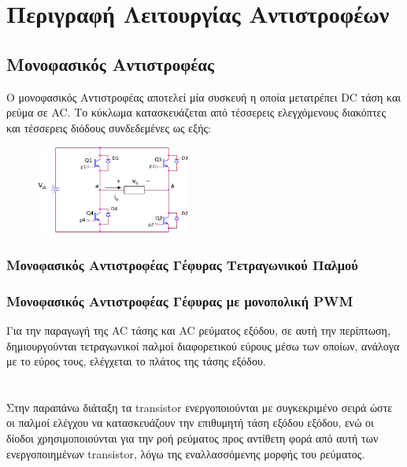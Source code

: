 \section{Περιγραφή Λειτουργίας Αντιστροφέων}

\subsection{Μονοφασικός Αντιστροφέας}
\noindent
Ο μονοφασικός Αντιστροφέας αποτελεί μία συσκευή η οποία μετατρέπει DC τάση και ρεύμα σε AC. Το κύκλωμα κατασκευάζεται από τέσσερεις ελεγχόμενους διακόπτες και τέσσερεις διόδους συνδεδεμένες ως εξής:
\begin{figure}[H]
	\centering
	\includegraphics[width=0.45\textwidth]{Images/circuit1.png}
	\label{circuit_1}
\end{figure}

\subsubsection{Μονοφασικός Αντιστροφέας Γέφυρας Τετραγωνικού Παλμού}
\subsubsection{Μονοφασικός Αντιστροφέας Γέφυρας με μονοπολική PWM}
\label{single_PWM}

\noindent
Για την παραγωγή της AC τάσης και AC ρεύματος εξόδου, σε αυτή την περίπτωση, δημιουργούνται τετραγωνικοί παλμοί διαφορετικού εύρους μέσω των οποίων, ανάλογα με το εύρος τους, ελέγχεται το πλάτος της τάσης εξόδου.
\noindent\\\\\\
Στην παραπάνω διάταξη τα transistor ενεργοποιούνται με συγκεκριμένο σειρά ώστε οι παλμοί ελέγχου να κατασκευάζουν την επιθυμητή τάση εξόδου εξόδου, ενώ οι δίοδοι χρησιμοποιούνται  για την ροή ρεύματος προς αντίθετη φορά από αυτή των ενεργοποιημένων transistor, λόγω της εναλλασσόμενης μορφής του ρεύματος.

